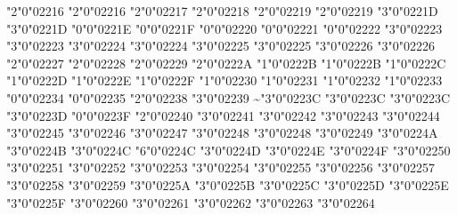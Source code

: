 \mchardef\smallsetminus"2"0"02216
\mchardef\setminus"2"0"02216
\mchardef\ast"2"0"02217
\mchardef\vysmwhtcircle"2"0"02218
\let\circ\vysmwhtcircle
\mchardef\vysmblkcircle"2"0"02219
\let\bullet\vysmblkcircle
\mchardef\bullet"2"0"02219
\def\sqrt{\delim"4"0"0221A }
\let\surd\sqrt
\def\surd{\delim"4"0"0221A }
\mchardef\propto"3"0"0221D
\mchardef\varpropto"3"0"0221D
\mchardef\infty"0"0"0221E
\mchardef\rightangle"0"0"0221F
\mchardef\angle"0"0"02220
\mchardef\measuredangle"0"0"02221
\mchardef\sphericalangle"0"0"02222
\mchardef\mid"3"0"02223
\mchardef\shortmid"3"0"02223
\mchardef\nmid"3"0"02224
\mchardef\nshortmid"3"0"02224
\mchardef\parallel"3"0"02225
\mchardef\shortparallel"3"0"02225
\mchardef\nparallel"3"0"02226
\mchardef\nshortparallel"3"0"02226
\mchardef\wedge"2"0"02227
\mchardef\vee"2"0"02228
\mchardef\cap"2"0"02229
\mchardef\cup"2"0"0222A
\mchardef\intop"1"0"0222B
\def\int{\intop\nolimits}
\mchardef\smallint"1"0"0222B
\mchardef\iint"1"0"0222C
\let\doubleint\iint
\mchardef\iiint"1"0"0222D
\mchardef\oint"1"0"0222E
\mchardef\oiint"1"0"0222F
\let\csi\oiint
\mchardef\oiiint"1"0"02230
\mchardef\intclockwise"1"0"02231
\mchardef\varointclockwise"1"0"02232
\mchardef\ointctrclockwise"1"0"02233
\mchardef\therefore"0"0"02234
\mchardef\because"0"0"02235
\mchardef\dotminus"2"0"02238
\mchardef\dashcolon"3"0"02239
\mchardef\sim"3"0"0223C
\mchardef\thicksim"3"0"0223C
\mchardef\difference"3"0"0223C
\mchardef\backsim"3"0"0223D
\mchardef\sinewave"0"0"0223F
\mchardef\wr"2"0"02240
\mchardef\nsim"3"0"02241
\mchardef\eqsim"3"0"02242
\mchardef\simeq"3"0"02243
\mchardef\nsime"3"0"02244
\mchardef\cong"3"0"02245
\mchardef\simneqq"3"0"02246
\mchardef\ncong"3"0"02247
\mchardef\approx"3"0"02248
\mchardef\thickapprox"3"0"02248
\mchardef\napprox"3"0"02249
\mchardef\approxeq"3"0"0224A
\mchardef\approxident"3"0"0224B
\mchardef\backcong"3"0"0224C
\mchardef\varbackcong"6"0"0224C
\mchardef\asymp"3"0"0224D
\mchardef\Bumpeq"3"0"0224E
\mchardef\bumpeq"3"0"0224F
\mchardef\doteq"3"0"02250
\mchardef\Doteq"3"0"02251
\mchardef\fallingdotseq"3"0"02252
\mchardef\risingdotseq"3"0"02253
\mchardef\coloneq"3"0"02254
\mchardef\eqcolon"3"0"02255
\mchardef\eqcirc"3"0"02256
\mchardef\circeq"3"0"02257
\mchardef\arceq"3"0"02258
\mchardef\wedgeq"3"0"02259
\let\cor\wedgeq
\mchardef\veeeq"3"0"0225A
\mchardef\stareq"3"0"0225B
\mchardef\triangleq"3"0"0225C
\let\de\triangleq
\mchardef\eqdef"3"0"0225D
\mchardef\measeq"3"0"0225E
\mchardef\questeq"3"0"0225F
\mchardef\ne"3"0"02260
\mchardef\equiv"3"0"02261
\mchardef\nequiv"3"0"02262
\mchardef\Equiv"3"0"02263
\mchardef\leq"3"0"02264
